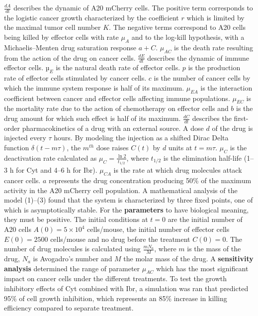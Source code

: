 $\frac{dA}{dt}$ describes the dynamic of A20 mCherry cells. The positive term corresponds to the logistic cancer growth characterized by the coefficient $r$ which is limited by the maximal tumor cell number $K$. 
The negative terms correspond to A20 cells being killed by effector cells with rate $\mu_A$ and to the log-kill hypothesis, with a Michaelis–Menten drug saturation response $a + C$. $\mu_{AC}$ is the death rate resulting from the action of the drug on cancer cells.
$\frac{dE}{dt}$ describes the dynamic of immune effector cells. $µ_{E}$ is the natural death rate of effector cells. $p$ is the production rate of effector cells stimulated by cancer cells. $c$ is the number of cancer cells by which the immune system response is half of its maximum. 
$\mu_{EA}$ is the interaction coefficient between cancer and effector cells affecting immune populations. $\mu_{EC}$ is the mortality rate due to the action of chemotherapy on effector cells and $b$ is the drug amount for which such effect is half of its maximum.
$\frac{dC}{dt}$ describes the first-order pharmacokinetics of a drug with an external source. A dose $d$ of the drug is injected every $\tau$ hours. By modeling the injection as a shifted Dirac Delta function $\delta (t − m\tau)$, the $m^{th}$ dose raises $C(t)$ by $d$ units at $t=m\tau$. $\mu_C$ is the deactivation rate calculated as $\mu_C = \frac{\ln 2}{t_{1/2}}$, where $t_{1/2}$ is the elimination half-life (1–3 h for Cyt and 4–6 h for Ibr). $\mu_{CA}$ is the rate at which drug molecules attack cancer cells. 
$a$ represents the drug concentration producing 50\% of the maximum activity in the A20 mCherry cell population. A mathematical analysis of the model (1)–(3) found that the system is characterized by three fixed points, one of which is asymptotically stable.
For the \textbf{parameters} to have biological meaning, they must be positive. The initial conditions at $t=0$ are the initial number of A20 cells $A(0) = 5 \times 10^4$ cells/mouse, the initial number of effector cells $E(0) = 2500$ cells/mouse and no drug before the treatment $C(0)=0$. The number of drug molecules is calculated using $\frac{mN_a}{M}$, where $m$ is the mass of the drug, $N_a$ is Avogadro's number and $M$ the molar mass of the drug.
A \textbf{sensitivity analysis} determined the range of parameter $\mu_{AC}$ which has the most significant impact on cancer cells under the different treatments. To test the growth inhibitory effects of Cyt combined with Ibr, a simulation was ran that predicted 95\% of cell growth inhibition, which represents an 85\% increase in killing efficiency compared to separate treatment.
